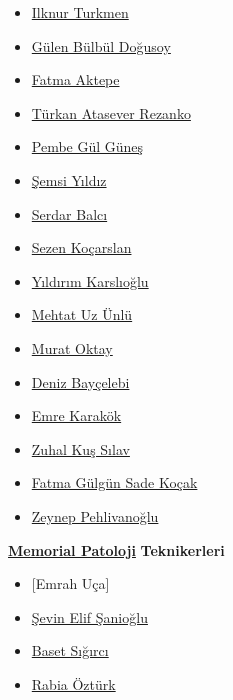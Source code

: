 \documentclass[
  letterpaper,
  DIV=11,
  numbers=noendperiod]{scrreprt}
\begin{document}
\begin{itemize}
\item
  \href{https://www.memorial.com.tr/en/doctors/ilknur-turkmen-1975}{Ilknur
  Turkmen}
\item
  \href{https://www.memorial.com.tr/doktorlar/gulen-bulbul-dogusoy}{Gülen
  Bülbül Doğusoy}
\item
  \href{https://www.memorial.com.tr/doktorlar/fatma-aktepe}{Fatma
  Aktepe}
\item
  \href{https://www.memorial.com.tr/doktorlar/turkan-atasever-rezanko}{Türkan
  Atasever Rezanko}
\item
  \href{https://www.memorial.com.tr/doktorlar/pembe-gul-gunes}{Pembe Gül
  Güneş}
\item
  \href{https://www.memorial.com.tr/doktorlar/semsi-yildiz}{Şemsi
  Yıldız}
\item
  \href{https://www.memorial.com.tr/doktorlar/serdar-balci}{Serdar
  Balcı}
\item
  \href{https://www.memorial.com.tr/doktorlar/sezen-kocarslan}{Sezen
  Koçarslan}
\item
  \href{https://www.memorial.com.tr/doktorlar/yildirim-karslioglu}{Yıldırım
  Karslıoğlu}
\item
  \href{https://www.memorial.com.tr/doktorlar/mehtat-uz-unlu}{Mehtat Uz
  Ünlü}
\item
  \href{https://www.memorial.com.tr/doktorlar/murat-oktay}{Murat Oktay}
\item
  \href{https://www.memorial.com.tr/doktorlar/deniz-baycelebi}{Deniz
  Bayçelebi}
\item
  \href{https://www.memorial.com.tr/doktorlar/emre-karakok}{Emre
  Karakök}
\item
  \href{https://www.memorial.com.tr/doktorlar/zuhal-kus-silav}{Zuhal Kuş
  Sılav}
\item
  \href{https://www.memorial.com.tr/doktorlar/fatma-gulgun-sade-kocak}{Fatma
  Gülgün Sade Koçak}
\item
  \href{https://www.memorial.com.tr/doktorlar/zeynep-pehlivanoglu}{Zeynep
  Pehlivanoğlu}
\end{itemize}

\href{https://patoloji.memorial.com.tr/}{\textbf{Memorial Patoloji}}
\textbf{Teknikerleri}

\begin{itemize}
\item
  {[}Emrah Uça{]}
\item
  \href{https://www.linkedin.com/in/\%C5\%9Fevin-elif-\%C5\%9Fanio\%C4\%9Flu-99449a1b0/}{Şevin
  Elif Şanioğlu}
\item
  \href{https://www.linkedin.com/in/baset-s\%C4\%B1\%C4\%9F\%C4\%B1rc\%C4\%B1-aa2406141/}{Baset
  Sığırcı}
\item
  \href{https://www.linkedin.com/in/rabia-\%C3\%B6zt\%C3\%BCrk-4989b3151/}{Rabia
  Öztürk}
\end{itemize}
\end{document}
